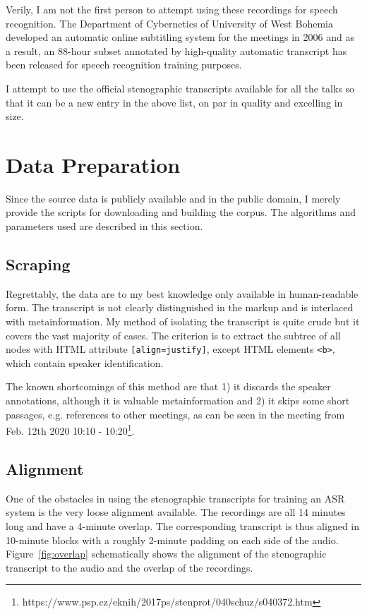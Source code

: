 \documentclass[conference]{IEEEtran}
\begin{document}
Verily, I am not the first person to attempt using these recordings for speech
recognition. The Department of Cybernetics of University of West Bohemia
developed an automatic online subtitling system for the meetings in
2006\cite{pspsubs} and as a result, an 88-hour subset annotated by high-quality
automatic transcript has been released for speech recognition training
purposes\cite{pspdata}.

I attempt to use the official stenographic transcripts available for all the
talks so that it can be a new entry in the above list, on par in quality and
excelling in size.

\section{Data Preparation}

Since the source data is publicly available and in the public domain, I merely
provide the scripts for downloading and building the corpus. The algorithms and
parameters used are described in this section.

\subsection{Scraping}

Regrettably, the data are to my best knowledge only available in human-readable
form. The transcript is not clearly distinguished in the markup and is
interlaced with metainformation. My method of isolating the transcript is quite
crude but it covers the vast majority of cases. The criterion is to extract the
subtree of all nodes with HTML attribute \texttt{[align=justify]}, except HTML
elements \texttt{<b>}, which contain speaker identification.

The known shortcomings of this method are that 1) it discards the speaker
annotations, although it is valuable metainformation and 2) it skips some short
passages, e.g. references to other meetings, as can be seen in the meeting
from Feb. 12th 2020 10:10 -
10:20\footnote{https://www.psp.cz/eknih/2017ps/stenprot/040schuz/s040372.htm}.

\subsection{Alignment}

One of the obstacles in using the stenographic transcripts for training an ASR
system is the very loose alignment available. The recordings are all 14 minutes
long and have a 4-minute overlap. The corresponding transcript is thus aligned
in 10-minute blocks with a roughly 2-minute padding on each side of the audio.
Figure~\ref{fig:overlap} schematically shows the alignment of the stenographic
transcript to the audio and the overlap of the recordings.
\end{document}
